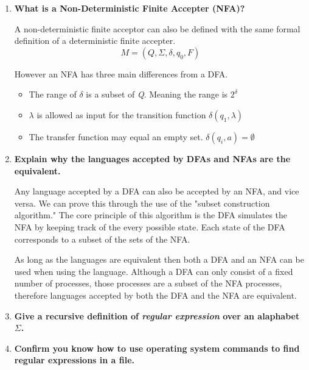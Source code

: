 \documentclass{article}
\begin{document}
\begin{enumerate}
    \medskip

    \item \textbf{What is a Non-Deterministic Finite Accepter (NFA)?}
    
    \medskip

    \-\hspace{0.5cm} A non-deterministic finite acceptor can also be defined with the same formal definition
    of a deterministic finite accepter.
    \[M = (Q, \Sigma, \delta, q_0, F)\]

    \-\hspace{0.5cm} However an NFA has three main differences from a DFA.

    \begin{itemize}
        \item The range of $\delta$ is a subset of \textit{Q}. Meaning the range is $2^\delta$
        \item $\lambda$ is allowed as input for the transition function $\delta(q_1, \lambda)$
        \item The transfer function may equal an empty set. $\delta(q_i, a) = {\emptyset}$
    \end{itemize}




    \medskip

    \item \textbf{Explain why the languages accepted by DFAs and NFAs are the equivalent.}
    
    \medskip

    \-\hspace{0.5cm} Any language accepted by a DFA can also be accepted by an NFA,
     and vice versa. We can prove this through the use of the "subset construction
     algorithm." The core principle of this algorithm is the DFA simulates the NFA
     by keeping track of the every possible state. Each state of the DFA corresponds
     to a subset of the sets of the NFA.

     \-\hspace{0.5cm} As long as the languages are equivalent then both a DFA and an 
     NFA can be used when using the language. Although a DFA can only consist of a 
     fixed number of processes, those processes are a subset of the NFA processes,
     therefore languages accepted by both the DFA and the NFA are equivalent.

    \medskip

    \item \textbf{Give a recursive definition of \textit{regular expression} over
            an alaphabet $\Sigma$.}

    \medskip


    \medskip

    \item \textbf{Confirm you know how to use operating system commands to find
            regular expressions in a file.}

    \medskip


    \medskip
\end{enumerate}
\end{document}
